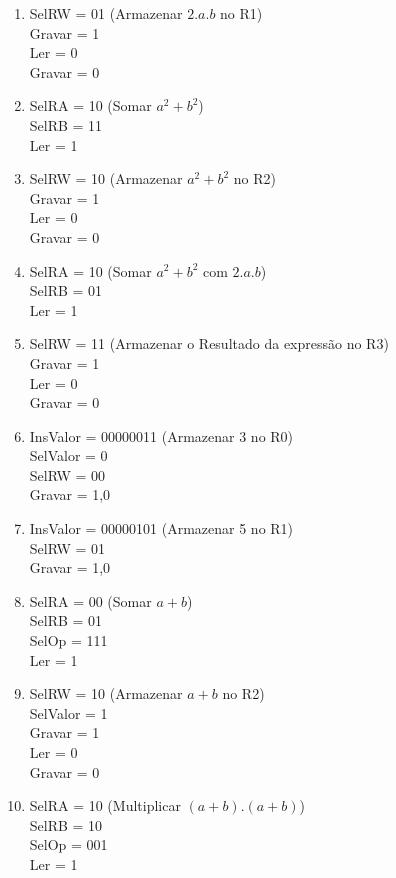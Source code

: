 \documentclass[]{article}
\begin{document}
\begin{enumerate}
			\item SelRW = 01 (Armazenar $2.a.b$ no R1)
			\\ Gravar = 1
			\\ Ler = 0
			\\ Gravar = 0
			
			\item SelRA = 10 (Somar $a^2+b^2$)
			\\ SelRB = 11
			\\ Ler = 1
			
			\item SelRW = 10 (Armazenar $a^2+b^2$ no R2)
			\\ Gravar = 1
			\\ Ler = 0
			\\ Gravar = 0
			
			\item SelRA = 10 (Somar $a^2+b^2$ com $2.a.b$)
			\\ SelRB = 01
			\\ Ler = 1
			
			\item SelRW = 11 (Armazenar o Resultado da expressão no R3)
			\\ Gravar = 1
			\\ Ler = 0
			\\ Gravar = 0
			
			\item InsValor = 00000011 (Armazenar 3 no R0)
			\\ SelValor = 0
			\\ SelRW = 00
			\\ Gravar = 1,0
			
			\item InsValor = 00000101 (Armazenar 5 no R1)
			\\ SelRW = 01
			\\ Gravar = 1,0
			
			\item SelRA = 00 (Somar $a+b$)
			\\ SelRB = 01
			\\ SelOp = 111
			\\ Ler = 1
			
			\item SelRW = 10 (Armazenar $a+b$ no R2)
			\\ SelValor = 1
			\\ Gravar = 1
			\\ Ler = 0
			\\ Gravar = 0
			
			\item SelRA = 10 (Multiplicar $(a+b).(a+b)$)
			\\ SelRB = 10 
			\\ SelOp = 001
			\\ Ler = 1
						

\end{enumerate}
\end{document}
